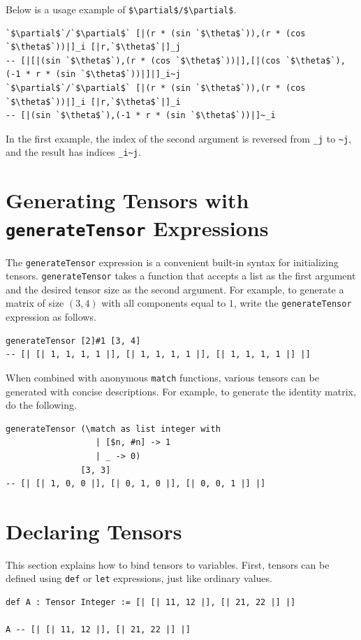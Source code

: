 Below is a usage example of \lstinline[mathescape]!$\partial$/$\partial$!.
\begin{lstlisting}[language=egison,numbers=none]
`$\partial$`/`$\partial$` [|(r * (sin `$\theta$`)),(r * (cos `$\theta$`))|]_i [|r,`$\theta$`|]_j
-- [|[|(sin `$\theta$`),(r * (cos `$\theta$`))|],[|(cos `$\theta$`),(-1 * r * (sin `$\theta$`))|]|]_i~j
`$\partial$`/`$\partial$` [|(r * (sin `$\theta$`)),(r * (cos `$\theta$`))|]_i [|r,`$\theta$`|]_i
-- [|(sin `$\theta$`),(-1 * r * (sin `$\theta$`))|]~_i
\end{lstlisting}

In the first example, the index of the second argument is reversed from \lstinline{_j} to \lstinline{~j}, and the result has indices \lstinline{_i~j}.

\section{Generating Tensors with \texttt{generateTensor} Expressions}

The \lstinline{generateTensor} expression is a convenient built-in syntax for initializing tensors.
\lstinline{generateTensor} takes a function that accepts a list as the first argument and the desired tensor size as the second argument.
For example, to generate a matrix of size $(3, 4)$ with all components equal to $1$, write the \lstinline{generateTensor} expression as follows.
\begin{lstlisting}[language=egison,numbers=none]
generateTensor [2]#1 [3, 4]
-- [| [| 1, 1, 1, 1 |], [| 1, 1, 1, 1 |], [| 1, 1, 1, 1 |] |]
\end{lstlisting}

When combined with anonymous \lstinline{match} functions, various tensors can be generated with concise descriptions.
For example, to generate the identity matrix, do the following.
\begin{lstlisting}[language=egison,numbers=none]
generateTensor (\match as list integer with
                  | [$n, #n] -> 1
                  | _ -> 0)
               [3, 3]
-- [| [| 1, 0, 0 |], [| 0, 1, 0 |], [| 0, 0, 1 |] |]
\end{lstlisting}

\section{Declaring Tensors}

This section explains how to bind tensors to variables.
First, tensors can be defined using \lstinline{def} or \lstinline{let} expressions, just like ordinary values.
\begin{lstlisting}[language=egison,numbers=none]
def A : Tensor Integer := [| [| 11, 12 |], [| 21, 22 |] |]

A -- [| [| 11, 12 |], [| 21, 22 |] |]
\end{lstlisting}

